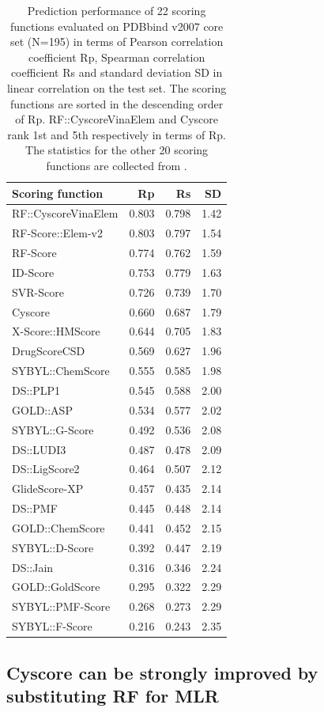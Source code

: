 \documentclass[journal=jacsat,manuscript=article]{achemso}
\begin{document}
\begin{table}[ht]
\caption{Prediction performance of 22 scoring functions evaluated on PDBbind v2007 core set (N=195) in terms of Pearson correlation coefficient Rp, Spearman correlation coefficient Rs and standard deviation SD in linear correlation on the test set. The scoring functions are sorted in the descending order of Rp. RF::CyscoreVinaElem and Cyscore rank 1st and 5th respectively in terms of Rp. The statistics for the other 20 scoring functions are collected from \cite{1362,1370}.}
\label{tbl:trn1105tst195}
\begin{tabular}{lrrr}
\hline
Scoring function & Rp & Rs & SD\\
\hline
RF::CyscoreVinaElem & 0.803 & 0.798 & 1.42\\
RF-Score::Elem-v2 & 0.803 & 0.797 & 1.54 \\
RF-Score & 0.774 & 0.762 & 1.59\\
ID-Score & 0.753 & 0.779 & 1.63\\
SVR-Score & 0.726 & 0.739 & 1.70\\
Cyscore & 0.660 & 0.687 & 1.79\\
X-Score::HMScore & 0.644 & 0.705 & 1.83\\
DrugScoreCSD & 0.569 & 0.627 & 1.96\\
SYBYL::ChemScore & 0.555 & 0.585 & 1.98\\
DS::PLP1 & 0.545 & 0.588 & 2.00\\
GOLD::ASP & 0.534 & 0.577 & 2.02\\
SYBYL::G-Score & 0.492 & 0.536 & 2.08\\
DS::LUDI3 & 0.487 & 0.478 & 2.09\\
DS::LigScore2 & 0.464 & 0.507 & 2.12\\
GlideScore-XP & 0.457 & 0.435 & 2.14\\
DS::PMF & 0.445 & 0.448 & 2.14\\
GOLD::ChemScore & 0.441 & 0.452 & 2.15\\
SYBYL::D-Score & 0.392 & 0.447 & 2.19\\
DS::Jain & 0.316 & 0.346 & 2.24\\
GOLD::GoldScore & 0.295 & 0.322 & 2.29\\
SYBYL::PMF-Score & 0.268 & 0.273 & 2.29\\
SYBYL::F-Score & 0.216 & 0.243 & 2.35\\
\hline
\end{tabular}
\end{table}

\subsection{Cyscore can be strongly improved by substituting RF for MLR}
\end{document}
